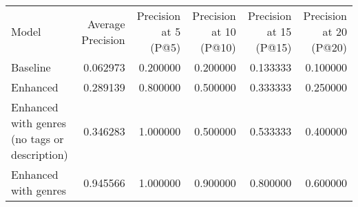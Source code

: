 \begin{tabular}{lrrrrr}
Model & Average Precision & Precision at 5 (P@5) & Precision at 10 (P@10) & Precision at 15 (P@15) & Precision at 20 (P@20) \\
Baseline & 0.062973 & 0.200000 & 0.200000 & 0.133333 & 0.100000 \\
Enhanced & 0.289139 & 0.800000 & 0.500000 & 0.333333 & 0.250000 \\
Enhanced with genres (no tags or description) & 0.346283 & 1.000000 & 0.500000 & 0.533333 & 0.400000 \\
Enhanced with genres & 0.945566 & 1.000000 & 0.900000 & 0.800000 & 0.600000 \\
\end{tabular}
